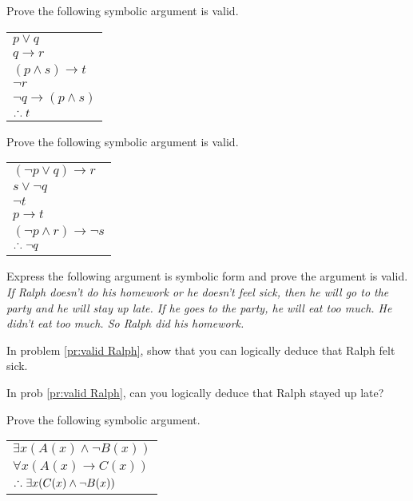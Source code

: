 \begin{prob}
Prove the following symbolic argument is valid.
\begin{center}
  \begin{tabular}{l}
  $p\lor  q$  \\ 
  $ q\to r$   \\ 
  $(p \land s)\to t$   \\ 
  $\lnot r$   \\ 
  $\lnot q \to (p \land s)$   \\ 
  \hline
  $\thus  t$
  \end{tabular}
\end{center}
\end{prob}

\begin{prob}
Prove the following symbolic argument is valid.
\begin{center}
  \begin{tabular}{l}
  $(\lnot p\lor  q) \to r$  \\   
  $ s \lor \lnot q$   \\ 
  $\lnot t$\\
  $p \to t$   \\ 
  $(\lnot p \land r) \to \lnot s$   \\ 
  \hline
  $\thus  \lnot q$
  \end{tabular}
\end{center}
\end{prob}

\begin{prob}\label{pr:valid Ralph}
Express the following argument is symbolic form and prove the argument is valid. 
{\itshape If Ralph doesn't do his homework 
or he doesn't feel sick, then he will go to the party and  he will stay up late. If he goes to the
party, he will eat too much.  He didn't eat too much. So Ralph did his homework.}
\end{prob}

\begin{prob}
In problem \ref{pr:valid Ralph}, show that you can logically deduce that Ralph felt sick.
\end{prob}

\begin{prob}
In prob \ref{pr:valid Ralph}, can you logically deduce that Ralph stayed up late?
\end{prob}

\begin{prob}
Prove the following symbolic argument.

\begin{tabular}[t]{l}
$\exists{x}(A(x)\land\neg B(x))$ \\
$\forall{x}(A(x) \to C(x))$ \\
\hline
$\thus \exists{x}(C(x)\land \neg B(x))$
\end{tabular}

\end{prob}



